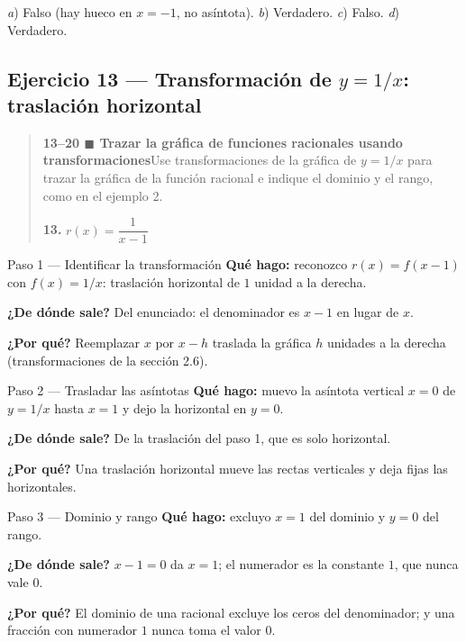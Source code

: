\documentclass[11pt]{article}
\begin{document}
\begin{resp}
\emph{a}) Falso (hay hueco en $x=-1$, no asíntota). \quad \emph{b}) Verdadero. \quad \emph{c}) Falso. \quad \emph{d}) Verdadero.
\end{resp}

\subsection*{Ejercicio 13 — Transformación de $y=1/x$: traslación horizontal}

\begin{quote}
\textbf{13--20 $\blacksquare$ Trazar la gráfica de funciones racionales usando transformaciones}\quad Use transformaciones de la gráfica de $y=1/x$ para trazar la gráfica de la función racional e indique el dominio y el rango, como en el ejemplo 2.

\textbf{13.} $r(x)=\dfrac{1}{x-1}$
\end{quote}

\begin{paso}{Paso 1 --- Identificar la transformación}
\textbf{Qué hago:} reconozco $r(x)=f(x-1)$ con $f(x)=1/x$: traslación horizontal de $1$ unidad a la derecha.

\textbf{¿De dónde sale?} Del enunciado: el denominador es $x-1$ en lugar de $x$.

\textbf{¿Por qué?} Reemplazar $x$ por $x-h$ traslada la gráfica $h$ unidades a la derecha (transformaciones de la sección 2.6).
\end{paso}

\begin{paso}{Paso 2 --- Trasladar las asíntotas}
\textbf{Qué hago:} muevo la asíntota vertical $x=0$ de $y=1/x$ hasta $x=1$ y dejo la horizontal en $y=0$.

\textbf{¿De dónde sale?} De la traslación del paso 1, que es solo horizontal.

\textbf{¿Por qué?} Una traslación horizontal mueve las rectas verticales y deja fijas las horizontales.
\end{paso}

\begin{paso}{Paso 3 --- Dominio y rango}
\textbf{Qué hago:} excluyo $x=1$ del dominio y $y=0$ del rango.

\textbf{¿De dónde sale?} $x-1=0$ da $x=1$; el numerador es la constante $1$, que nunca vale $0$.

\textbf{¿Por qué?} El dominio de una racional excluye los ceros del denominador; y una fracción con numerador $1$ nunca toma el valor $0$.
\end{paso}
\end{document}
